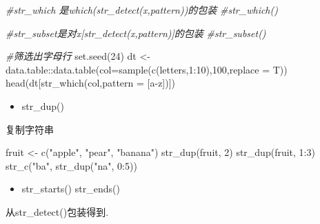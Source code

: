 \documentclass[
]{book}
\newenvironment{Shaded}{\begin{snugshade}}{\end{snugshade}}
\newcommand{\AttributeTok}[1]{\textcolor[rgb]{0.77,0.63,0.00}{#1}}
\newcommand{\CommentTok}[1]{\textcolor[rgb]{0.56,0.35,0.01}{\textit{#1}}}
\newcommand{\DecValTok}[1]{\textcolor[rgb]{0.00,0.00,0.81}{#1}}
\newcommand{\FunctionTok}[1]{\textcolor[rgb]{0.00,0.00,0.00}{#1}}
\newcommand{\NormalTok}[1]{#1}
\newcommand{\OtherTok}[1]{\textcolor[rgb]{0.56,0.35,0.01}{#1}}
\newcommand{\SpecialCharTok}[1]{\textcolor[rgb]{0.00,0.00,0.00}{#1}}
\newcommand{\StringTok}[1]{\textcolor[rgb]{0.31,0.60,0.02}{#1}}
\providecommand{\tightlist}{%
  \setlength{\itemsep}{0pt}\setlength{\parskip}{0pt}}
\begin{document}
\begin{Shaded}
\begin{Highlighting}[]
\CommentTok{\#str\_which 是which(str\_detect(x,pattern))的包装}
\CommentTok{\#str\_which()}

\CommentTok{\#str\_subset是对x[str\_detect(x,pattern)]的包装}
\CommentTok{\#str\_subset()}

\CommentTok{\#筛选出字母行}
\FunctionTok{set.seed}\NormalTok{(}\DecValTok{24}\NormalTok{)}
\NormalTok{dt }\OtherTok{\textless{}{-}}\NormalTok{ data.table}\SpecialCharTok{::}\FunctionTok{data.table}\NormalTok{(}\AttributeTok{col=}\FunctionTok{sample}\NormalTok{(}\FunctionTok{c}\NormalTok{(letters,}\DecValTok{1}\SpecialCharTok{:}\DecValTok{10}\NormalTok{),}\DecValTok{100}\NormalTok{,}\AttributeTok{replace =}\NormalTok{ T))}
\FunctionTok{head}\NormalTok{(dt[}\FunctionTok{str\_which}\NormalTok{(col,}\AttributeTok{pattern =} \StringTok{\textquotesingle{}[a{-}z]\textquotesingle{}}\NormalTok{)])}
\end{Highlighting}
\end{Shaded}

\begin{itemize}
\tightlist
\item
  str\_dup()
\end{itemize}

复制字符串

\begin{Shaded}
\begin{Highlighting}[]
\NormalTok{fruit }\OtherTok{\textless{}{-}} \FunctionTok{c}\NormalTok{(}\StringTok{"apple"}\NormalTok{, }\StringTok{"pear"}\NormalTok{, }\StringTok{"banana"}\NormalTok{)}
\FunctionTok{str\_dup}\NormalTok{(fruit, }\DecValTok{2}\NormalTok{)}
\FunctionTok{str\_dup}\NormalTok{(fruit, }\DecValTok{1}\SpecialCharTok{:}\DecValTok{3}\NormalTok{)}
\FunctionTok{str\_c}\NormalTok{(}\StringTok{"ba"}\NormalTok{, }\FunctionTok{str\_dup}\NormalTok{(}\StringTok{"na"}\NormalTok{, }\DecValTok{0}\SpecialCharTok{:}\DecValTok{5}\NormalTok{))}
\end{Highlighting}
\end{Shaded}

\begin{itemize}
\tightlist
\item
  str\_starts() str\_ends()
\end{itemize}

从str\_detect()包装得到.
\end{document}
